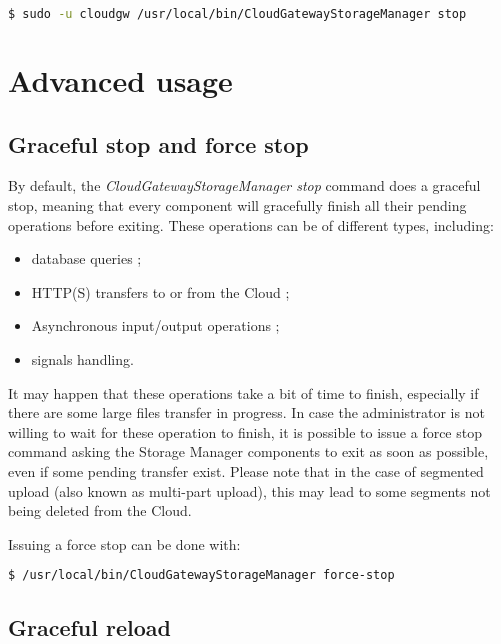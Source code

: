 \documentclass[11pt,fleqn,openany]{book} %
\begin{document}
\begin{lstlisting}[language=bash]
$ sudo -u cloudgw /usr/local/bin/CloudGatewayStorageManager stop
\end{lstlisting}

\cleardoublepage %
\chapter{Advanced usage}
\label{chap:advanced-usage}

\section{Graceful stop and force stop}
\label{sec:graceful-stop-and-force-stop}

By default, the \textit{CloudGatewayStorageManager stop} command does a graceful stop, meaning that
every component will gracefully finish all their pending operations before exiting. These operations
can be of different types, including:
\begin{itemize}
\item database queries ;
\item HTTP(S) transfers to or from the Cloud ;
\item Asynchronous input/output operations ;
\item signals handling.\\
\end{itemize}

It may happen that these operations take a bit of time to finish, especially if there are some large
files transfer in progress.
In case the administrator is not willing to wait for these operation to finish, it is possible to issue
a force stop command asking the Storage Manager components to exit as soon as possible, even if some pending
transfer exist. Please note that in the case of segmented upload (also known as multi-part upload), this may lead
to some segments not being deleted from the Cloud.

Issuing a force stop can be done with:\\

\begin{lstlisting}[language=bash]
$ /usr/local/bin/CloudGatewayStorageManager force-stop
\end{lstlisting}

\section{Graceful reload}
\label{sec:graceful-reload}
\end{document}
